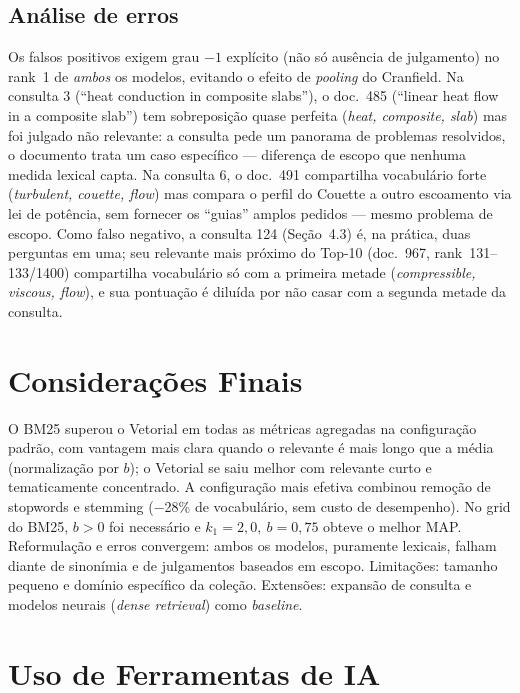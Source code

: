 \documentclass[runningheads]{llncs}
\begin{document}
\vspace{-1.0em}
\subsection{Análise de erros}

Os falsos positivos exigem grau $-1$ explícito (não só ausência de julgamento) no rank~1 de \emph{ambos} os modelos, evitando o efeito de \emph{pooling} do Cranfield. Na consulta 3 (``heat conduction in composite slabs''), o doc.~485 (``linear heat flow in a composite slab'') tem sobreposição quase perfeita (\emph{heat, composite, slab}) mas foi julgado não relevante: a consulta pede um panorama de problemas resolvidos, o documento trata um caso específico --- diferença de escopo que nenhuma medida lexical capta. Na consulta 6, o doc.~491 compartilha vocabulário forte (\emph{turbulent, couette, flow}) mas compara o perfil do Couette a outro escoamento via lei de potência, sem fornecer os ``guias'' amplos pedidos --- mesmo problema de escopo. Como falso negativo, a consulta 124 (Seção~4.3) é, na prática, duas perguntas em uma; seu relevante mais próximo do Top-10 (doc.~967, rank~131--133/1400) compartilha vocabulário só com a primeira metade (\emph{compressible, viscous, flow}), e sua pontuação é diluída por não casar com a segunda metade da consulta.

\vspace{-1.0em}
\section{Considerações Finais}

O BM25 superou o Vetorial em todas as métricas agregadas na configuração padrão, com vantagem mais clara quando o relevante é mais longo que a média (normalização por $b$); o Vetorial se saiu melhor com relevante curto e tematicamente concentrado. A configuração mais efetiva combinou remoção de stopwords e stemming ($-$28\% de vocabulário, sem custo de desempenho). No grid do BM25, $b>0$ foi necessário e $k_1=2{,}0,\ b=0{,}75$ obteve o melhor MAP. Reformulação e erros convergem: ambos os modelos, puramente lexicais, falham diante de sinonímia e de julgamentos baseados em escopo. Limitações: tamanho pequeno e domínio específico da coleção. Extensões: expansão de consulta e modelos neurais (\emph{dense retrieval}) como \emph{baseline}.

\vspace{-1.0em}
\section{Uso de Ferramentas de IA}
\end{document}
